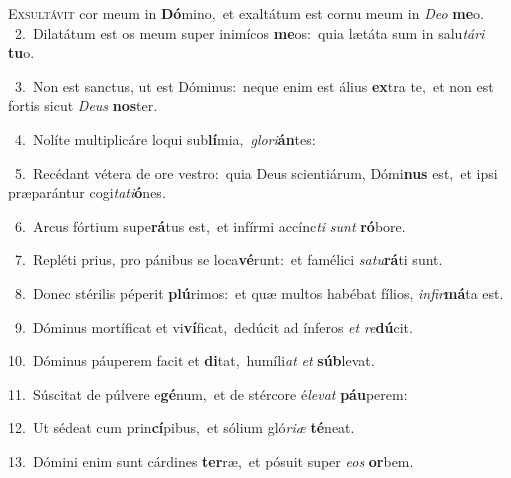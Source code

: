 \lettrine{\initial\textcolor{\initialcolor}{E}}{xsultávit} cor meum in \textbf{Dó}\-mino,~\star et exaltátum est cornu meum in \textit{De}\-\textit{o} \textbf{me}\-o.\\
{\numbfont\textcolor{\numbcolor}{~2.}}~Dilatátum est os meum super inimícos \textbf{me}\-os:~\star quia lætáta sum in salu\-\textit{tá}\-\textit{ri} \textbf{tu}\-o.\par
{\numbfont\textcolor{\numbcolor}{~3.}}~Non est sanctus, ut est Dóminus:~\dagger neque enim est álius \textbf{ex}\-tra te,~\star et non est fortis sicut \textit{De}\-\textit{us} \textbf{nos}\-ter.\par
{\numbfont\textcolor{\numbcolor}{~4.}}~Nolíte multiplicáre loqui sub\-\textbf{lí}\-mia,~\star \textit{glo}\-\textit{ri}\textbf{án}tes:\par
{\numbfont\textcolor{\numbcolor}{~5.}}~Recédant vétera de ore vestro:~\dagger quia Deus scientiárum, Dómi\textbf{nus} est,~\star et ipsi præparántur cogi\-\textit{ta}\-\textit{ti}\textbf{ó}nes.\par
{\numbfont\textcolor{\numbcolor}{~6.}}~Arcus fórtium supe\-\textbf{rá}\-tus est,~\star et infírmi accínc\textit{ti} \textit{sunt} \textbf{ró}\-bore.\par
{\numbfont\textcolor{\numbcolor}{~7.}}~Repléti prius, pro pánibus se loca\-\textbf{vé}\-runt:~\star et famélici \textit{sa}\-\textit{tu}\textbf{rá}ti sunt.\par
{\numbfont\textcolor{\numbcolor}{~8.}}~Donec stérilis péperit \textbf{plú}\-rimos:~\star et quæ multos habébat fílios, \textit{in}\-\textit{fir}\textbf{má}ta est.\par
{\numbfont\textcolor{\numbcolor}{~9.}}~Dóminus mortíficat et vi\-\textbf{ví}\-ficat,~\star dedúcit ad ínferos \textit{et} \textit{re}\-\textbf{dú}cit.\par
{\numbfont\textcolor{\numbcolor}{10.}}~Dóminus páuperem facit et \textbf{di}\-tat,~\star humíli\textit{at} \textit{et} \textbf{súb}\-levat.\par
{\numbfont\textcolor{\numbcolor}{11.}}~Súscitat de púlvere e\-\textbf{gé}\-num,~\star et de stércore é\-\textit{le}\-\textit{vat} \textbf{páu}\-perem:\par
{\numbfont\textcolor{\numbcolor}{12.}}~Ut sédeat cum prin\-\textbf{cí}\-pibus,~\star et sólium gló\-\textit{ri}\-\textit{æ} \textbf{té}\-neat.\par
{\numbfont\textcolor{\numbcolor}{13.}}~Dómini enim sunt cárdines \textbf{ter}\-ræ,~\star et pósuit super \textit{e}\-\textit{os} \textbf{or}\-bem.\par
